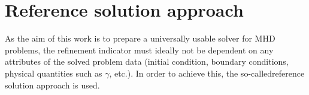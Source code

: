 \section{Reference solution approach}
As the aim of this work is to prepare a universally usable solver for MHD problems, the refinement indicator  must ideally not be dependent on any attributes of the solved problem data (initial condition, boundary conditions, physical quantities such as $\gamma$, etc.). In order to achieve this, the so-called{reference solution} approach is used.
\subsection{}